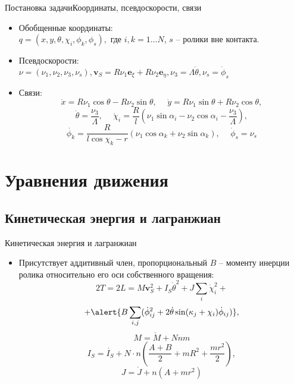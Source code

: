 \documentclass{beamer}
\renewcommand{\vec}[1]{\boldsymbol{\mathbf{#1}}}
\begin{document}
\begin{frame}{Постановка задачи}{Координаты, псевдоскорости, связи}
  \begin{itemize}
  \item {
    Обобщенные координаты: \\
    $q = (x, y, \theta, \chi_i, \phi_k, \phi_s),$ где $i,k = 1\dots N$, $s$ -- ролики вне контакта.
  }
  \item{
    Псевдоскорости:\\
    $\nu = (\nu_1, \nu_2, \nu_3, \nu_s), \vec{v}_S = R\nu_1\vec{e}_\xi + R\nu_2\vec{e}_\eta, \nu_3 = \Lambda\dot{\theta}, \nu_s = \dot{\phi}_s$
  }
  \item {
    Связи:
	$$ \dot{x} = R \nu_1\cos\theta-R\nu_2\sin\theta, \hspace{15pt} \dot{y} = R\nu_1\sin\theta+R\nu_2\cos\theta,$$
	$$\dot{\theta} = \frac{\nu_3}{\Lambda}, \hspace{15pt} \dot{\chi}_i = \frac{R}{l}(\nu_1\sin\alpha_i - \nu_2\cos\alpha_i - \frac{\nu_3}{\Lambda}), $$
	$$ \dot{\phi_k} = \frac{R}{l\cos\chi_k-r}(\nu_1\cos\alpha_k + \nu_2\sin\alpha_k), \hspace{15pt} \dot{\phi}_s = \nu_s $$
  }

  \end{itemize}
\end{frame}

\section{Уравнения движения}

\subsection{Кинетическая энергия и лагранжиан}

\begin{frame}{Кинетическая энергия и лагранжиан}
  \begin{itemize}
  \item {
    Присутствует аддитивный член, пропорциональный $B$ -- моменту инерции ролика относительно его оси собственного вращения:
    $$ 2T = 2L = M\vec{v}_S^2 + I_S\dot{\theta}^2 + J\sum_i\dot{\chi}_i^2 + $$
    $$ + \alert{B\sum_{i,j}(\dot{\phi}_{ij}^2 + 2\dot{\theta}\sin(\kappa_j + \chi_i)\dot{\phi}_{ij})}, $$
    $$ M = \mathring{M} + Nnm $$
    $$ I_S = \mathring{I_S} + N\cdot n(\frac{A+B}{2} + mR^2 + \frac{mr^2}{2}), $$
    $$ J = \mathring{J} + n(A + mr^2) $$
  }

  \end{itemize}
\end{frame}
\end{document}
